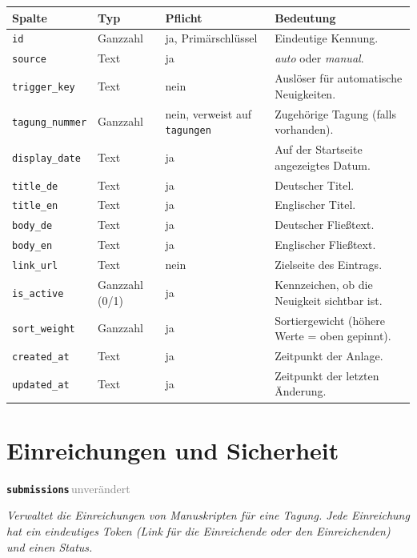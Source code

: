 \documentclass[11pt,a4paper,parskip=half-]{scrartcl}
\newcommand{\tabhead}[1]{\textsf{\textbf{\small\color{accent}#1}}}
\newcommand{\tagunv}{\textcolor{gray}{\sffamily\footnotesize\,unverändert\,}}
\newcommand{\tabletitle}[2]{%
  \par\vspace{1.1em}%
  \noindent%
  \begin{tcolorbox}[
    enhanced,
    colback=tabletitlebg,
    colframe=tabletitlebg,
    arc=2pt,
    boxrule=0pt,
    left=10pt, right=10pt, top=4pt, bottom=4pt,
    before skip=0pt, after skip=6pt
  ]
    {\sffamily\large\bfseries\color{white}\texttt{#1}}\hfill{#2}
  \end{tcolorbox}%
  \par\nobreak%
}
\begin{document}
\begin{tabularx}{\linewidth}{L{3.6cm} L{1.9cm} L{3.0cm} X}
\toprule
\tabhead{Spalte} & \tabhead{Typ} & \tabhead{Pflicht} & \tabhead{Bedeutung} \\
\midrule
\texttt{id}              & Ganzzahl & ja, Primärschlüssel & Eindeutige Kennung. \\
\texttt{source}          & Text     & ja & \textit{auto} oder \textit{manual}. \\
\texttt{trigger\_key}    & Text     & nein & Auslöser für automatische Neuigkeiten. \\
\texttt{tagung\_nummer}  & Ganzzahl & nein, verweist auf \texttt{tagungen} & Zugehörige Tagung (falls vorhanden). \\
\texttt{display\_date}   & Text     & ja & Auf der Startseite angezeigtes Datum. \\
\texttt{title\_de}       & Text     & ja & Deutscher Titel. \\
\texttt{title\_en}       & Text     & ja & Englischer Titel. \\
\texttt{body\_de}        & Text     & ja & Deutscher Fließtext. \\
\texttt{body\_en}        & Text     & ja & Englischer Fließtext. \\
\texttt{link\_url}       & Text     & nein & Zielseite des Eintrags. \\
\texttt{is\_active}      & Ganzzahl (0/1) & ja & Kennzeichen, ob die Neuigkeit sichtbar ist. \\
\texttt{sort\_weight}    & Ganzzahl & ja & Sortiergewicht (höhere Werte = oben gepinnt). \\
\texttt{created\_at}     & Text     & ja & Zeitpunkt der Anlage. \\
\texttt{updated\_at}     & Text     & ja & Zeitpunkt der letzten Änderung. \\
\bottomrule
\end{tabularx}

\section{Einreichungen und Sicherheit}

\tabletitle{submissions}{\tagunv}

\textit{Verwaltet die Einreichungen von Manuskripten für eine
Tagung. Jede Einreichung hat ein eindeutiges Token (Link für die
Einreichende oder den Einreichenden) und einen Status.}
\end{document}

